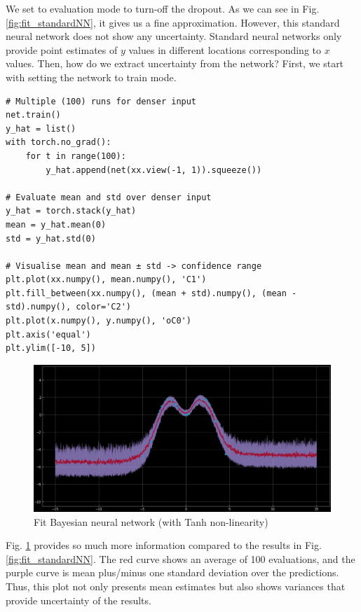 We set to evaluation mode to turn-off the dropout. As we can see in Fig. \ref{fig:fit_standardNN}, it gives us a fine approximation. However, this standard neural network does not show any uncertainty. Standard neural networks only provide point estimates of $y$ values in different locations corresponding to $x$ values. Then, how do we extract uncertainty from the network? First, we start with setting the network to train mode. 

\begin{verbatim}
# Multiple (100) runs for denser input
net.train()
y_hat = list()
with torch.no_grad():
    for t in range(100):
        y_hat.append(net(xx.view(-1, 1)).squeeze())
        
# Evaluate mean and std over denser input
y_hat = torch.stack(y_hat)
mean = y_hat.mean(0)
std = y_hat.std(0)

# Visualise mean and mean ± std -> confidence range
plt.plot(xx.numpy(), mean.numpy(), 'C1')
plt.fill_between(xx.numpy(), (mean + std).numpy(), (mean - std).numpy(), color='C2')
plt.plot(x.numpy(), y.numpy(), 'oC0')
plt.axis('equal')
plt.ylim([-10, 5])
\end{verbatim}

\begin{figure}[H]
    \centering
    \includegraphics[width=\textwidth]{labs/12/images/exp_3.png}
    \caption{Fit Bayesian neural network (with Tanh non-linearity)}
    \label{fig:fit_BayesianNN}
\end{figure}

Fig. \ref{fig:fit_BayesianNN} provides so much more information compared to the results in Fig. \ref{fig:fit_standardNN}. The red curve shows an average of 100 evaluations, and the purple curve is mean plus/minus one standard deviation over the predictions. Thus, this plot not only presents mean estimates but also shows variances that provide uncertainty of the results. 

